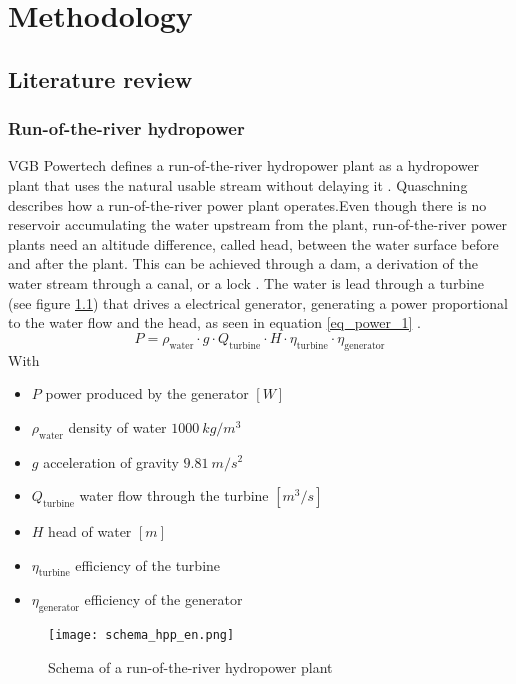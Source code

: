 \chapter{Methodology}
\label{chap:methodology}

\section{Literature review}
\subsection{Run-of-the-river hydropower}
VGB Powertech defines a run-of-the-river hydropower plant as a hydropower plant that uses the natural usable stream without delaying it \cite{vgb}. \newline
Quaschning \cite{quaschning} describes how a run-of-the-river power plant operates.Even though there is no reservoir accumulating the water upstream from the plant, run-of-the-river power plants need an altitude difference, called head, between the water surface before and after the plant. This can be achieved through a dam, a derivation of the water stream through a canal, or a lock \cite{tdi_petites_centrales}. The water is lead through a turbine (see figure \ref{schema_hpp}) that drives a electrical generator, generating a power proportional to the water flow and the head, as seen in equation \ref{eq_power_1} \cite{quaschning}.
\begin{equation}
\label{eq_power_1} 
 P = \rho_\mathrm{water} \cdot g \cdot Q_\mathrm{turbine} \cdot H \cdot \eta_\mathrm{turbine} \cdot \eta_\mathrm{generator}
\end{equation}
With 
\begin{itemize}
\itemsep0em 
 \item $P$ \tabto{4cm} power produced by the generator \tabto{12cm} $[W]$
 \item $\rho_\mathrm{water}$ \tabto{4cm} density of water \tabto{12cm} $1000 \ kg/m^3$
 \item $g$ \tabto{4cm} acceleration of gravity \tabto{12cm} $9.81 \ m/s^2$
 \item $Q_\mathrm{turbine}$ \tabto{4cm} water flow through the turbine \tabto{12cm} $[m^3/s]$
 \item $H$ \tabto{4cm} head of water \tabto{12cm} $[m]$
 \item $\eta_\mathrm{turbine}$ \tabto{4cm} efficiency of the turbine
 \item $\eta_\mathrm{generator}$ \tabto{4cm} efficiency of the generator
\end{itemize}
\begin{figure}[H]
\texttt{[image: schema\_hpp\_en.png]}
\caption[Schema of a run-of-the-river hydropower plant]{Schema of a run-of-the-river hydropower plant \cite{quaschning}}
\centering
\label{schema_hpp}
\end{figure}

